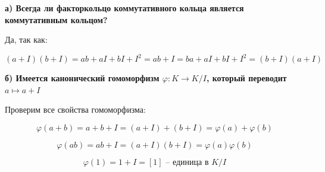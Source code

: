 \textbf{а) Всегда ли факторкольцо коммутативного кольца является коммутативным кольцом?}

Да, так как:

$$
(a + I)(b + I) = ab + aI + bI + I^2 = ab + I = 
ba + aI + bI + I^2 = (b + I)(a + I)
$$

\textbf{б) Имеется канонический гомоморфизм $\varphi: K \to K / I$, который переводит $a \mapsto a + I$}

Проверим все свойства гомоморфизма:

$$
\varphi(a + b) = a + b + I = (a + I) + (b + I) = \varphi(a) + \varphi(b)
$$

$$
\varphi(ab) = ab + I = (a + I)(b + I) = \varphi(a) \varphi(b)
$$

$$
\varphi(1) = 1 + I = [1] \text{ -- единица в } K / I
$$